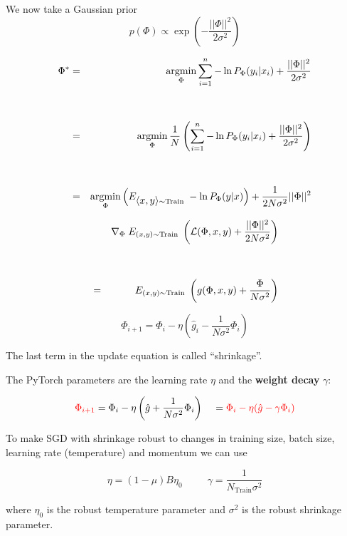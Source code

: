 {\vfill
We now take a Gaussian prior {\color{red} $$p(\Phi) \propto \exp\left(-\frac{||\Phi||^2}{2\sigma^2}\right)$$}


\begin{eqnarray*}
\Phi^* & = & \operatorname*{argmin}_\Phi \sum_{i = 1}^n - \ln P_\Phi(y_i|x_i) + \frac{||\Phi||^2}{2\sigma^2}  \\
\\
\\
& = & \operatorname*{argmin}_\Phi \frac{1}{N} \left(\sum_{i = 1}^n - \ln P_\Phi(y_i|x_i) + \frac{||\Phi||^2}{2\sigma^2}\right)  \\
\\
\\
& = & \operatorname*{argmin}_\Phi \left(E_{{\mbox{$\langle x,y\rangle$}}\sim \mathrm{Train}}\;-\ln P_\Phi(y|x)\right) + \frac{1}{2N\sigma^2} ||\Phi||^2
\end{eqnarray*}


\begin{eqnarray*}
  & & \nabla_\Phi \;E_{(x,y) \sim \mathrm{Train}}\;\left({\cal L}(\Phi,x,y) + \frac{||\Phi||^2}{2N\sigma^2}\right) \\
  \\
  \\
  & = & E_{(x,y) \sim \mathrm{Train}} \;\left(g(\Phi,x,y) + \frac{\Phi}{N\sigma^2}\right)
\end{eqnarray*}

\vfill
$$\Phi_{i+1} = \Phi_i - \eta\left(\hat{g}_i  - \frac{1}{N\sigma^2}\Phi_i\right)$$

\vfill
The last term in the update equation is called ``shrinkage''.


The PyTorch parameters are the learning rate $\eta$ and the {\bf weight decay} $\gamma$:

$${\color{red} \Phi_{i+1}} = \Phi_i - \eta\left(\hat{g} + \frac{1}{N\sigma^2}\Phi_i\right)\;\;\;\; = {\color{red} \Phi_i - \eta(\hat{g} - \gamma\Phi_i)}$$

\vfill
To make SGD with shrinkage robust to changes in training size, batch size, learning rate (temperature) and momentum we can use

\vfill
{\color{red} $$\eta = (1-\mu)B\eta_0\;\;\;\;\;\;\;\;\;\gamma = \frac{1}{N_{\mathrm{Train}}\sigma^2}$$}

\vfill
where $\eta_0$ is the robust temperature parameter and $\sigma^2$ is the robust shrinkage parameter.

}
